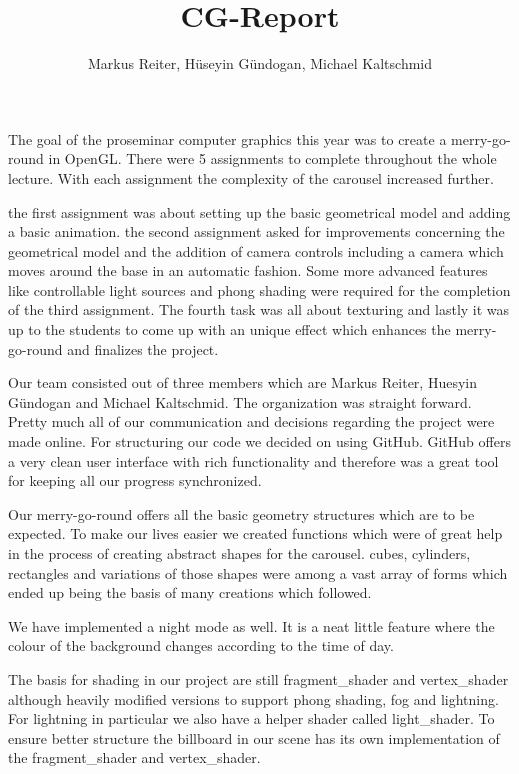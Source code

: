 \documentclass{report}
\title{CG-Report}
\author{Markus Reiter, Hüseyin Gündogan, Michael Kaltschmid}
\begin{document}
\maketitle

The goal of the proseminar computer graphics this year was to create a merry-go-round in OpenGL. There were 5 assignments to complete throughout the whole lecture. With each assignment the complexity of the carousel increased further. 
\par
the first assignment was about setting up the basic geometrical model and adding a basic animation. the second assignment asked for improvements concerning the geometrical model and the addition of camera controls including a camera which moves around the base in an automatic fashion. Some more advanced features like controllable light sources and phong shading were required for the completion of the third assignment. The fourth task was all about texturing and lastly it was up to the students to come up with an unique effect which enhances the merry-go-round and finalizes the project.
\par
Our team consisted out of three members which are Markus Reiter, Huesyin Gündogan and Michael Kaltschmid. The organization was straight forward. Pretty much all of our communication and decisions regarding the project were made online. For structuring our code we decided on using GitHub. GitHub offers a very clean user interface with rich functionality and therefore was a great tool for keeping all our progress synchronized. 
\par
Our merry-go-round offers all the basic geometry structures which are to be expected. To make our lives easier we created functions which were of great help in the process of creating abstract shapes for the carousel. cubes, cylinders, rectangles and variations of those shapes were among a vast array of forms which ended up being the basis of many creations which followed. 
\par
We have implemented a night mode as well. It is a neat little feature where the colour of the background changes according to the time of day.
\par
The basis for shading in our project are still fragment\_shader and vertex\_shader although heavily modified versions to support phong shading, fog and lightning. For lightning in particular we also have a helper shader called light\_shader. To ensure better structure the billboard in our scene has its own implementation of the fragment\_shader and vertex\_shader.
\par
\end{document}

